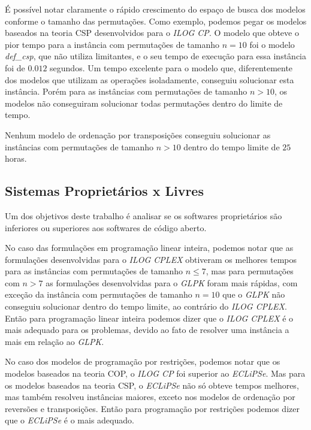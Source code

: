 É possível notar claramente o rápido crescimento do espaço de busca
dos modelos conforme o tamanho das permutações. Como exemplo, podemos
pegar os modelos baseados na teoria CSP desenvolvidos para
o \textit{ILOG CP}. O modelo que obteve o pior tempo para a instância
com permutações de tamanho $n = 10$ foi o modelo \textit{def\_csp},
que não utiliza limitantes, e o seu tempo de execução para essa
instância foi de $0.012$ segundos. Um tempo excelente para o modelo
que, diferentemente dos modelos que utilizam as operações
isoladamente, conseguiu solucionar esta instância. Porém para as
instâncias com permutações de tamanho $n > 10$, os modelos não
conseguiram solucionar todas permutações dentro do limite de tempo.

Nenhum modelo de ordenação por transposições conseguiu solucionar as
instâncias com permutações de tamanho $n > 10$ dentro do tempo limite
de $25$ horas.



\subsection{Sistemas Proprietários x Livres}
\label{subsec:analise_close_open}
Um dos objetivos deste trabalho é analisar se os softwares
proprietários são inferiores ou superiores aos softwares de código
aberto.

No caso das formulações em programação linear inteira, podemos notar
que as formulações desenvolvidas para o \textit{ILOG CPLEX} obtiveram
os melhores tempos para as instâncias com permutações de tamanho
$n \le 7$, mas para permutações com $n > 7$ as formulações
desenvolvidas para o \textit{GLPK} foram mais rápidas, com exceção da
instância com permutações de tamanho $n = 10$ que o \textit{GLPK} não
conseguiu solucionar dentro do tempo limite, ao contrário
do \textit{ILOG CPLEX}. Então para programação linear inteira podemos
dizer que o \textit{ILOG CPLEX} é o mais adequado para os problemas,
devido ao fato de resolver uma instância a mais em relação
ao \textit{GLPK}.

No caso dos modelos de programação por restrições, podemos notar que
os modelos baseados na teoria COP, o \textit{ILOG CP} foi superior
ao \textit{ECLiPSe}. Mas para os modelos baseados na teoria CSP,
o \textit{ECLiPSe} não só obteve tempos melhores, mas também resolveu
instâncias maiores, exceto nos modelos de ordenação por reversões e
transposições. Então para programação por restrições podemos dizer que
o \textit{ECLiPSe} é o mais adequado.


